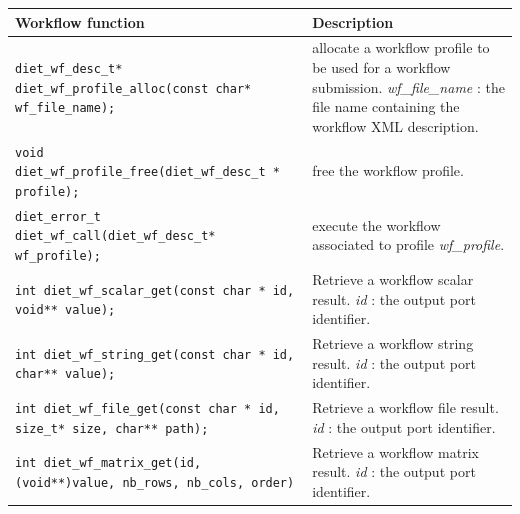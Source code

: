 \begin{table}[htbp]
  \centering
  \begin{tabular}[htbp]{|p{8cm}|p{7.5cm}|}\hline
    Workflow function & Description \\\hline
    \texttt{diet\_wf\_desc\_t*  \newline
      diet\_wf\_profile\_alloc(const char* wf\_file\_name);}
    &
    allocate a workflow profile to be used for a workflow submission.\newline
    \textit{wf\_file\_name} : the file name containing the workflow XML description.
    \\\hline
    \texttt{void  \newline
      diet\_wf\_profile\_free(diet\_wf\_desc\_t * profile);}
    &
    free the workflow profile.
    \\\hline
    \texttt{diet\_error\_t \newline
      diet\_wf\_call(diet\_wf\_desc\_t* wf\_profile);}
    &
    execute the workflow associated to profile \textit{wf\_profile}.
    \\\hline
    \texttt{int   \newline
      diet\_wf\_scalar\_get(const char * id, void** value);}
    &
    Retrieve a workflow scalar result. \newline
    \textit{id} : the output port identifier.
    \\\hline
    \texttt{int   \newline
      diet\_wf\_string\_get(const char * id, char** value);}
    &
    Retrieve a workflow string result. \newline
    \textit{id} : the output port identifier.
    \\\hline
    \texttt{int    \newline
      diet\_wf\_file\_get(const char * id, size\_t* size, char** path);
    }
    &
    Retrieve a workflow file result. \newline
    \textit{id} : the output port identifier.
    \\\hline
    \texttt{int \newline
      diet\_wf\_matrix\_get(id, (void**)value, nb\_rows, nb\_cols, order)
    }
    &
    Retrieve a workflow matrix result. \newline
    \textit{id} : the output port identifier.
    \\\hline

\end{tabular}
\end{table}
